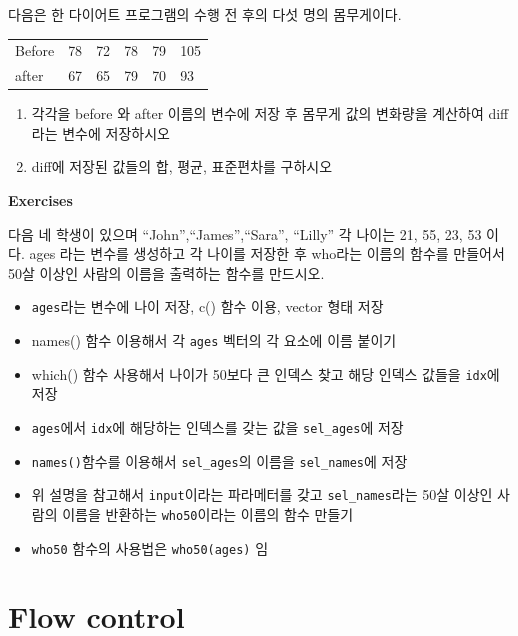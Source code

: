 \documentclass[
]{book}
\providecommand{\tightlist}{%
  \setlength{\itemsep}{0pt}\setlength{\parskip}{0pt}}
\begin{document}
다음은 한 다이어트 프로그램의 수행 전 후의 다섯 명의 몸무게이다.

\begin{longtable}[]{@{}llllll@{}}
\toprule()
\endhead
Before & 78 & 72 & 78 & 79 & 105 \\
after & 67 & 65 & 79 & 70 & 93 \\
\bottomrule()
\end{longtable}

\begin{enumerate}
\def\labelenumi{\arabic{enumi})}
\item
  각각을 before 와 after 이름의 변수에 저장 후 몸무게 값의 변화량을 계산하여 diff 라는 변수에 저장하시오
\item
  diff에 저장된 값들의 합, 평균, 표준편차를 구하시오
\end{enumerate}

\textbf{Exercises}

다음 네 학생이 있으며 ``John'',``James'',``Sara'', ``Lilly'' 각 나이는 21, 55, 23, 53 이다. ages 라는 변수를 생성하고 각 나이를 저장한 후 who라는 이름의 함수를 만들어서 50살 이상인 사람의 이름을 출력하는 함수를 만드시오.

\begin{itemize}
\tightlist
\item
  \texttt{ages}라는 변수에 나이 저장, c() 함수 이용, vector 형태 저장
\item
  names() 함수 이용해서 각 \texttt{ages} 벡터의 각 요소에 이름 붙이기
\item
  which() 함수 사용해서 나이가 50보다 큰 인덱스 찾고 해당 인덱스 값들을 \texttt{idx}에 저장
\item
  \texttt{ages}에서 \texttt{idx}에 해당하는 인덱스를 갖는 값을 \texttt{sel\_ages}에 저장
\item
  \texttt{names()}함수를 이용해서 \texttt{sel\_ages}의 이름을 \texttt{sel\_names}에 저장
\item
  위 설명을 참고해서 \texttt{input}이라는 파라메터를 갖고 \texttt{sel\_names}라는 50살 이상인 사람의 이름을 반환하는 \texttt{who50}이라는 이름의 함수 만들기
\item
  \texttt{who50} 함수의 사용법은 \texttt{who50(ages)} 임
\end{itemize}

\hypertarget{flow-control}{%
\section{Flow control}\label{flow-control}}
\end{document}
